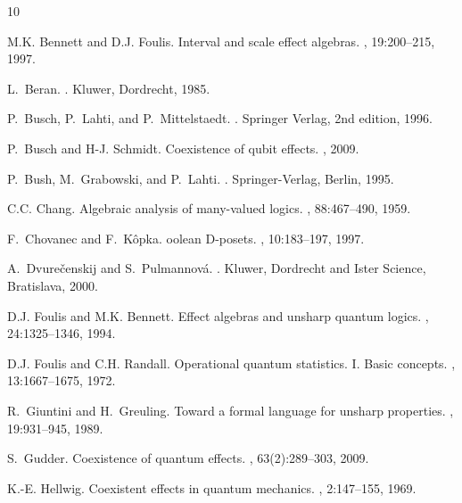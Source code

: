 \documentclass[letterpaper]{amsart}
\theoremstyle{definition}
\begin{document}
\begin{thebibliography}{10}

M.K. Bennett and D.J. Foulis.
\newblock Interval and scale effect algebras.
, 19:200--215, 1997.

L.~Beran.
.
\newblock Kluwer, Dordrecht, 1985.

P.~Busch, P.~Lahti, and P.~Mittelstaedt.
.
\newblock Springer Verlag, 2nd edition, 1996.

P.~Busch and H-J. Schmidt.
\newblock Coexistence of qubit effects.
, 2009.

P.~Bush, M.~Grabowski, and P.~Lahti.
.
\newblock Springer-Verlag, Berlin, 1995.

C.C. Chang.
\newblock Algebraic analysis of many-valued logics.
, 88:467--490, 1959.

F.~Chovanec and F.~K{\^o}pka.
oolean {D}-posets.
, 10:183--197, 1997.

A.~Dvure{\v c}enskij and S.~Pulmannov{\'a}.
.
\newblock Kluwer, Dordrecht and Ister Science, Bratislava, 2000.

D.J. Foulis and M.K. Bennett.
\newblock Effect algebras and unsharp quantum logics.
, 24:1325--1346, 1994.

D.J. Foulis and C.H. Randall.
\newblock Operational quantum statistics. {I.} {B}asic concepts.
, 13:1667--1675, 1972.

R.~Giuntini and H.~Greuling.
\newblock Toward a formal language for unsharp properties.
, 19:931--945, 1989.

S.~Gudder.
\newblock Coexistence of quantum effects.
, 63(2):289--303, 2009.

K.-E. Hellwig.
\newblock Coexistent effects in quantum mechanics.
, 2:147--155,
  1969.


\end{thebibliography}
\end{document}
